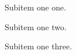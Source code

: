 \documentclass{article}
\begin{document}
    \begin{inparaenum}[(1)]
     \item Subitem one one.
     \item Subitem one two.
     \item Subitem one three.
   \end{inparaenum}
 
\end{document}
